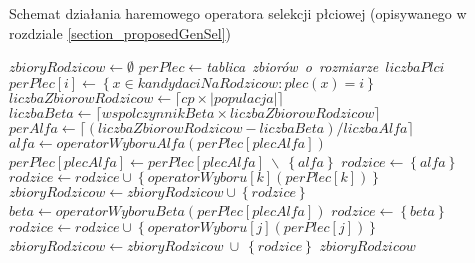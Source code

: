 \documentclass[twoside]{iisthesis}
\begin{document}
\begin{algorithm}
	\caption{Schemat działania haremowego operatora selekcji płciowej (opisywanego w rozdziale \ref{section_proposedGenSel})}
	\label{algorithm_proposedGenSel}
	\begin{algorithmic}[1]
		\Var $zbioryRodzicow \gets \emptyset$
		\Var $perPlec \gets $\textit{tablica\ zbiorów\ o\ rozmiarze\ }$liczbaPlci$
		\State $perPlec[i] \gets \left\{  x \in kandydaciNaRodzicow : plec(x) = i \right\}$
		\EndFor
		\Var $liczbaZbiorowRodzicow \gets \lceil cp \times |populacja| \rceil$
		\Var $liczbaBeta \gets \lceil wspolczynnikBeta \times liczbaZbiorowRodzicow \rceil$
		\Var $perAlfa \gets \lceil (liczbaZbiorowRodzicow-liczbaBeta)/liczbaAlfa \rceil$
		\Var $alfa \gets operatorWyboruAlfa(perPlec[plecAlfa])$
		\State $perPlec[plecAlfa] \gets perPlec[plecAlfa]\ \backslash\ \left\{ alfa \right\}$
		\Var $rodzice \gets \left\{ alfa \right\}$
		\State $rodzice \gets rodzice \cup \left\{ operatorWyboru[k](perPlec[k]) \right\}$
		\EndIf
		\EndFor
		\State $zbioryRodzicow \gets zbioryRodzicow \cup \left\{ rodzice \right\}$
		\EndFor
		\EndFor
		\Var $beta \gets operatorWyboruBeta(perPlec[plecAlfa])$
		\Var $rodzice \gets \left\{ beta \right\}$
		\State $rodzice \gets rodzice \cup \left\{ operatorWyboru[j](perPlec[j]) \right\}$
		\EndIf
		\EndFor
		\State $zbioryRodzicow \gets zbioryRodzicow\ \cup\ \left\{ rodzice \right\}$
		\EndFor
		\State \Return $zbioryRodzicow$
		\EndFunction
	\end{algorithmic}
\end{algorithm}
\end{document}
